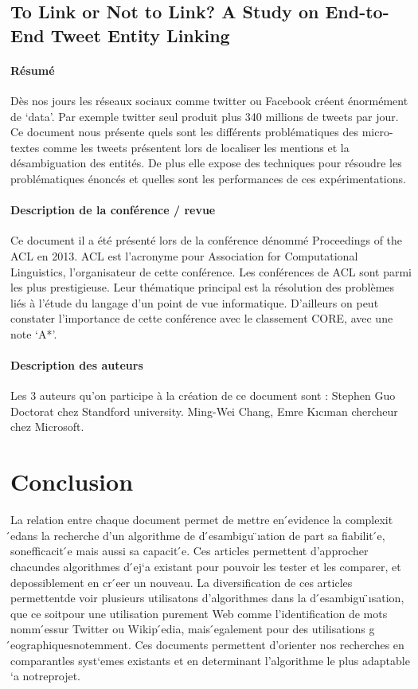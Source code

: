 \documentclass{article}
\begin{document}
\subsection{To Link or Not to Link? A Study on End-to-End Tweet Entity Linking \cite{article-15}}

\paragraph{Résumé}
Dès nos jours les réseaux sociaux comme twitter ou Facebook créent énormément de ‘data’. Par exemple twitter seul produit plus 340 millions de tweets par jour. Ce document nous présente quels sont les différents problématiques des micro-textes comme les tweets présentent lors de localiser les mentions et la désambiguation des entités. De plus elle expose des techniques pour résoudre les problématiques énoncés et quelles sont les performances de ces expérimentations.


\paragraph{Description de la conférence / revue}
Ce document il a été présenté lors de la conférence dénommé Proceedings of the ACL en 2013. ACL est l’acronyme pour Association for Computational Linguistics, l’organisateur de cette conférence.
Les conférences de ACL sont parmi les plus prestigieuse. Leur thématique principal est la résolution des problèmes liés à l’étude du langage d’un point de vue informatique. 
D’ailleurs on peut constater l’importance de cette conférence avec le classement CORE, avec une note ‘A*’.


\paragraph{Description des auteurs}
Les 3 auteurs qu’on participe à la création de ce document sont :
Stephen Guo Doctorat chez Standford university.
Ming-Wei Chang, Emre Kıcıman chercheur chez Microsoft. 




\section{Conclusion}
La relation entre chaque document permet de mettre en  ́evidence la complexit ́edans la recherche d’un algorithme de d ́esambigu ̈ıation de part sa fiabilit ́e, sonefficacit ́e  mais  aussi  sa  capacit ́e.   Ces  articles  permettent  d’approcher  chacundes  algorithmes  d ́ej`a  existant  pour  pouvoir  les  tester  et  les  comparer,  et  depossiblement en cr ́eer un nouveau.  La diversification de ces articles permettentde voir plusieurs utilisatons d’algorithmes dans la d ́esambigu ̈ısation, que ce soitpour  une  utilisation  purement  Web  comme  l’identification  de  mots  nomm ́essur Twitter ou Wikip ́edia, mais  ́egalement pour des utilisations g ́eographiquesnotemment.  Ces documents permettent d’orienter nos recherches en comparantles syst`emes existants et en determinant l’algorithme le plus adaptable `a notreprojet.







\end{document}
